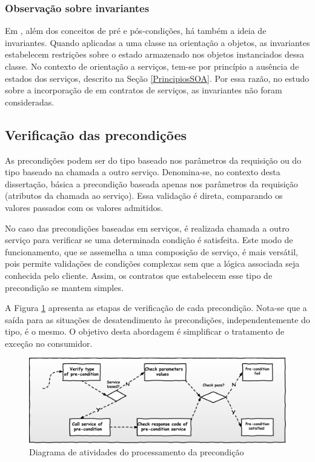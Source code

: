 \subsubsection{Observação sobre invariantes}
\vspace{-6mm}

Em \designbycontract{}, além dos conceitos de pré e pós-condições,
há também a ideia de invariantes\cite{meyer1997object}. Quando aplicadas a uma classe na
orientação a objetos, as invariantes estabelecem restrições sobre o estado
armazenado nos objetos instanciados dessa classe. No contexto de orientação a
serviços, tem-se por princípio a ausência de estados dos serviços, descrito na
Seção \ref{PrincipiosSOA}. Por essa razão, no estudo sobre a incorporação de
\designbycontract{} em contratos de serviços, as invariantes não foram
consideradas.


\subsection{Verificação das precondições}
\vspace{-6mm}

As precondições podem ser do tipo baseado nos parâmetros da requisição ou do
tipo baseado na chamada a outro serviço. Denomina-se, no contexto desta
dissertação, básica a precondição baseada apenas nos parâmetros da
requisição (atributos da chamada ao serviço). Essa validação é direta,
comparando os valores passados com os valores admitidos. 

No caso das precondições baseadas em serviços, é realizada chamada a outro
serviço para verificar se uma determinada condição é satisfeita. Este modo de
funcionamento, que se assemelha a uma composição de serviço, é mais versátil, pois permite
validações de condições complexas sem que a lógica associada seja conhecida pelo
cliente. Assim, os contratos que estabelecem esse tipo de
precondição se mantem simples.

A Figura \ref{FigServicePrecondition} apresenta as etapas de verificação de cada
precondição. Nota-se que a saída para as situações de desatendimento às
precondições, independentemente do tipo, é o mesmo. O objetivo desta abordagem
é simplificar o tratamento de exceção no consumidor.

\begin{figure}[!htb]
\centering
\includegraphics[width=140mm,trim = 0mm 0mm 0mm
0mm,clip]{img/FluxoPrecondicoes.pdf}
\caption{Diagrama de atividades do processamento da precondição}
\label{FigServicePrecondition}
\end{figure}


